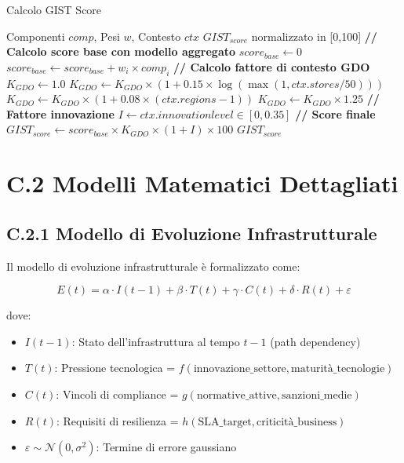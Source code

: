 \begin{algorithm}
\caption{Calcolo GIST Score}
\label{alg:gist}
\begin{algorithmic}
\Require Componenti $comp$, Pesi $w$, Contesto $ctx$
\Ensure $GIST_{score}$ normalizzato in [0,100]
\State \textbf{// Calcolo score base con modello aggregato}
\State $score_{base} \gets 0$
    \State $score_{base} \gets score_{base} + w_i \times comp_i$
\EndFor
\State \textbf{// Calcolo fattore di contesto GDO}
\State $K_{GDO} \gets 1.0$
\State $K_{GDO} \gets K_{GDO} \times (1 + 0.15 \times \log(\max(1, ctx.stores/50)))$
\State $K_{GDO} \gets K_{GDO} \times (1 + 0.08 \times (ctx.regions - 1))$
\State $K_{GDO} \gets K_{GDO} \times 1.25$ 
\State \textbf{// Fattore innovazione}
\State $I \gets ctx.innovation\mathit{level} \in [0, 0.35]$
\State \textbf{// Score finale}
\State $GIST_{score} \gets score_{base} \times K_{GDO} \times (1 + I) \times 100$
\State \Return $GIST_{score}$
\end{algorithmic}
\end{algorithm}

\section{C.2 Modelli Matematici Dettagliati}

\subsection{C.2.1 Modello di Evoluzione Infrastrutturale}

Il modello di evoluzione infrastrutturale è formalizzato come:

\begin{equation}
E(t) = \alpha \cdot I(t-1) + \beta \cdot T(t) + \gamma \cdot C(t) + \delta \cdot R(t) + \varepsilon
\label{eq:evolution}
\end{equation}

dove:
\begin{itemize}
    \item $I(t-1)$: Stato dell'infrastruttura al tempo $t-1$ (path dependency)
    \item $T(t)$: Pressione tecnologica = $f(\text{innovazione\_settore}, \text{maturità\_tecnologie})$
    \item $C(t)$: Vincoli di compliance = $g(\text{normative\_attive}, \text{sanzioni\_medie})$
    \item $R(t)$: Requisiti di resilienza = $h(\text{SLA\_target}, \text{criticità\_business})$
    \item $\varepsilon \sim \mathcal{N}(0, \sigma^2)$: Termine di errore gaussiano
\end{itemize}

